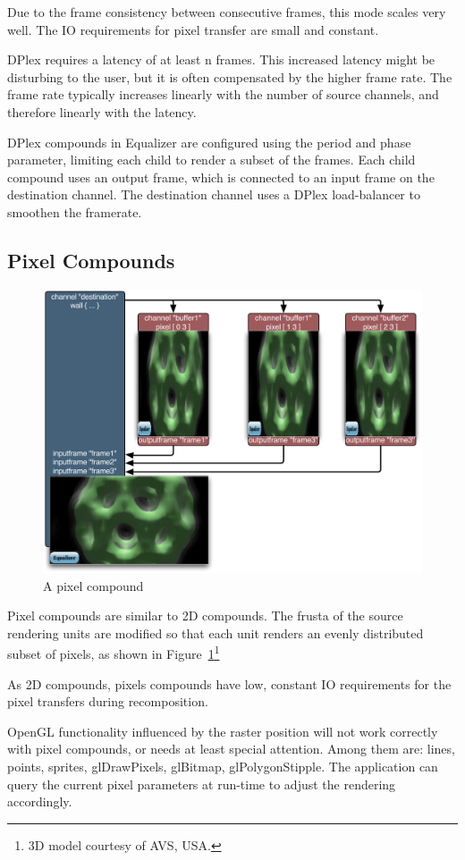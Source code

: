 \documentclass[10pt,a4]{scrartcl}
\newcommand{\fig}[1]{Figure~\ref{#1}}
\begin{document}
Due to the frame consistency between consecutive frames, this mode scales
very well. The IO requirements for pixel transfer are small and
constant.

DPlex requires a latency of at least n frames. This increased latency
might be disturbing to the user, but it is often compensated by the
higher frame rate. The frame rate typically increases linearly with the
number of source channels, and therefore linearly with the latency.

DPlex compounds in Equalizer are configured using the \textsf{period}
and \textsf{phase} parameter, limiting each child to render a subset of
the frames. Each child compound uses an output frame, which is connected
to an input frame on the destination channel. The destination channel
uses a DPlex load-balancer to smoothen the framerate.


\subsection{Pixel Compounds}

\begin{figure}
  \vspace{-1ex}\includegraphics[width=.618\textwidth]{images/Pixel.pdf}
  {\caption{\label{fPixel}\small A pixel compound}}
  \vspace{-6ex}
\end{figure}
Pixel compounds are similar to 2D compounds. The frusta of the
source rendering units are modified so that each unit renders an evenly
distributed subset of pixels, as shown in \fig{fPixel}\footnote{3D model courtesy of AVS, USA.}

As 2D compounds, pixels compounds have low, constant IO requirements for
the pixel transfers during recomposition.

OpenGL functionality influenced by the raster position will not work
correctly with pixel compounds, or needs at least special
attention. Among them are: lines, points, sprites, glDrawPixels,
glBitmap, glPolygonStipple. The application can query the current pixel
parameters at run-time to adjust the rendering accordingly.
\end{document}

